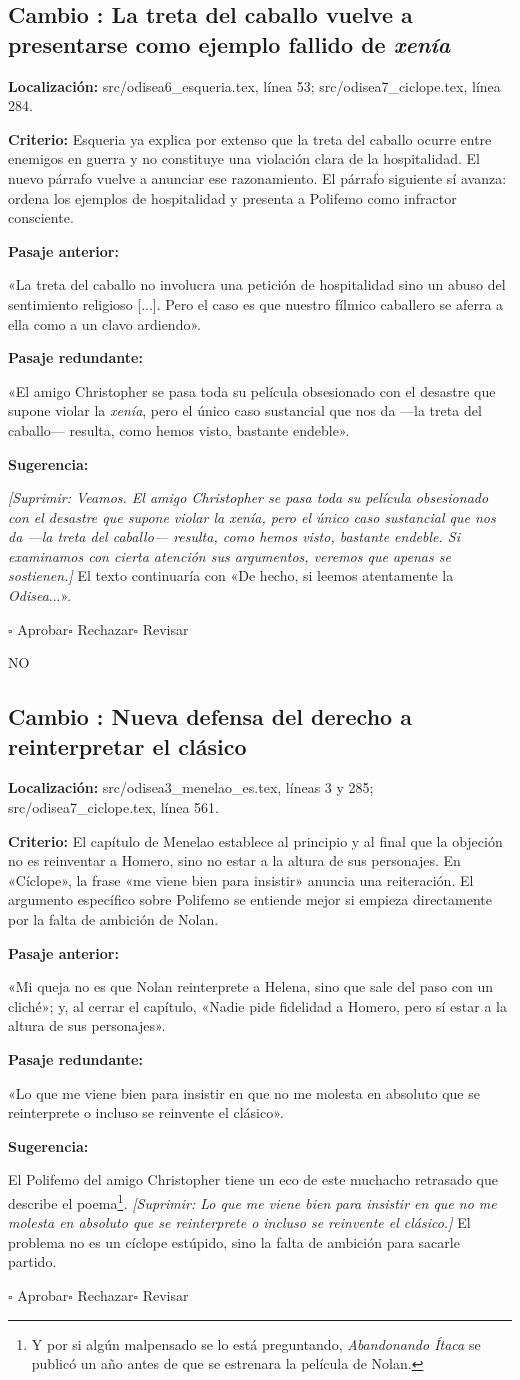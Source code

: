 \documentclass[12pt,a4paper]{article}
\newcommand{\camb}[1]{\textcolor{rojocambio}{\textit{#1}}}
\newcommand{\quita}[1]{\textcolor{rojocambio}{\textit{[Suprimir: #1]}}}
\newcounter{cambio}
\newcommand{\propuesta}[6]{%
  \refstepcounter{cambio}%
  \subsection*{Cambio \thecambio: #1}
  \noindent\textbf{Localización:} #2.\par
  \noindent\textbf{Criterio:} #3\par
  \medskip
  \noindent\textbf{Pasaje anterior:}\par
  #4\par
  \medskip
  \noindent\textbf{Pasaje redundante:}\par
  #5\par
  \medskip
  \noindent\textbf{Sugerencia:}\par
  #6\par
  \medskip
  \noindent$\square$ Aprobar\qquad$\square$ Rechazar\qquad$\square$ Revisar
  \par\bigskip
}
\begin{document}
\propuesta
  {La treta del caballo vuelve a presentarse como ejemplo fallido de \emph{xenía}}
  {src/odisea6\_esqueria.tex, línea 53; src/odisea7\_ciclope.tex, línea 284}
  {Esqueria ya explica por extenso que la treta del caballo ocurre entre enemigos en guerra y no constituye una violación clara de la hospitalidad. El nuevo párrafo vuelve a anunciar ese razonamiento. El párrafo siguiente sí avanza: ordena los ejemplos de hospitalidad y presenta a Polifemo como infractor consciente.}
  {«La treta del caballo no involucra una petición de hospitalidad sino un abuso del sentimiento religioso [...]. Pero el caso es que nuestro fílmico caballero se aferra a ella como a un clavo ardiendo».}
  {«El amigo Christopher se pasa toda su película obsesionado con el desastre que supone violar la \emph{xenía}, pero el único caso sustancial que nos da ---la treta del caballo--- resulta, como hemos visto, bastante endeble».}
  {\quita{Veamos. El amigo Christopher se pasa toda su película obsesionado con el desastre que supone violar la \emph{xenía}, pero el único caso sustancial que nos da ---la treta del caballo--- resulta, como hemos visto, bastante endeble. Si examinamos con cierta atención sus argumentos, veremos que apenas se sostienen.} El texto continuaría con «De hecho, si leemos atentamente la \emph{Odisea}...».}


NO

\propuesta
  {Nueva defensa del derecho a reinterpretar el clásico}
  {src/odisea3\_menelao\_es.tex, líneas 3 y 285; src/odisea7\_ciclope.tex, línea 561}
  {El capítulo de Menelao establece al principio y al final que la objeción no es reinventar a Homero, sino no estar a la altura de sus personajes. En «Cíclope», la frase «me viene bien para insistir» anuncia una reiteración. El argumento específico sobre Polifemo se entiende mejor si empieza directamente por la falta de ambición de Nolan.}
  {«Mi queja no es que Nolan reinterprete a Helena, sino que sale del paso con un cliché»; y, al cerrar el capítulo, «Nadie pide fidelidad a Homero, pero sí estar a la altura de sus personajes».}
  {«Lo que me viene bien para insistir en que no me molesta en absoluto que se reinterprete o incluso se reinvente el clásico».}
  {El Polifemo del amigo Christopher tiene un eco de este muchacho retrasado que describe el poema\footnote{Y por si algún malpensado se lo está preguntando, \emph{Abandonando Ítaca} se publicó un año antes de que se estrenara la película de Nolan.}\camb{.} \quita{Lo que me viene bien para insistir en que no me molesta en absoluto que se reinterprete o incluso se reinvente el clásico.} El problema no es un cíclope estúpido, sino la falta de ambición para sacarle partido.}
\end{document}

